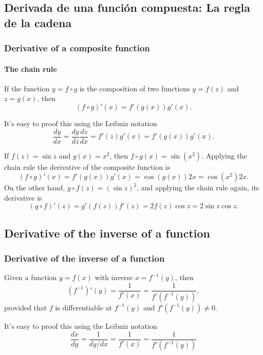 \subsection{Derivada de una función compuesta: La regla de la cadena}

\begin{frame}
\frametitle{Derivative of a composite function}
\framesubtitle{The chain rule}
\begin{theorem} If the function $y=f\circ g$ is the composition of two functions $y=f(z)$ and $z=g(x)$, then
\[
(f\circ g)'(x)=f'(g(x))g'(x).
\]
\end{theorem}

It's easy to proof this using the Leibniz notation
\[
\frac{dy}{dx}=\frac{dy}{dz}\frac{dz}{dx}=f'(z)g'(x)=f'(g(x))g'(x).
\]

 If $f(z)=\sin z$ and $g(x)=x^2$, then $f\circ g(x)=\sin(x^2)$. Applying the chain rule the derivative of the composite function is
\[
(f\circ g)'(x)=f'(g(x))g'(x) = \cos(g(x)) 2x = \cos(x^2)2x.
\]
On the other hand, $g\circ f(z)= (\sin z)^2$, and applying the chain rule again, its derivative is
\[
(g\circ f)'(z)=g'(f(z))f'(z) = 2f(z)\cos z = 2\sin z\cos z.
\]
\end{frame}



\subsection{Derivative of the inverse of a function}
\begin{frame}
\frametitle{Derivative of the inverse of a function}
\begin{theorem}
Given a function $y=f(x)$ with inverse $x=f^{-1}(y)$, then 
\[
\left(f^{-1}\right)'(y)=\frac{1}{f'(x)}=\frac{1}{f'(f^{-1}(y))},
\]
provided that $f$ is differentiable at $f^{-1}(y)$ and $f'(f^{-1}(y))\neq 0$.
\end{theorem}

It's easy to proof this using the Leibniz notation
\[
\frac{dx}{dy}=\frac{1}{dy/dx}=\frac{1}{f'(x)}=\frac{1}{f'(f^{-1}(y))}
\]
\end{frame}


